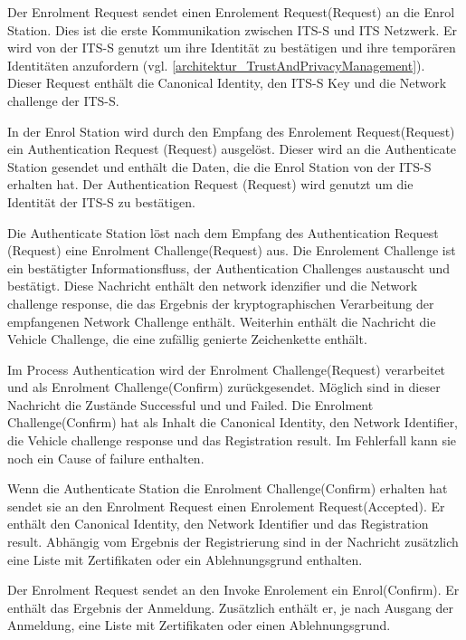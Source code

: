 Der Enrolment Request sendet einen Enrolement Request(Request) an die Enrol Station. Dies ist die erste Kommunikation zwischen \ac{ITS-S} und \ac{ITS} Netzwerk. Er wird von der \ac{ITS-S} genutzt um ihre Identität zu bestätigen und ihre temporären Identitäten anzufordern (vgl. \autoref{architektur_TrustAndPrivacyManagement}). Dieser Request enthält die Canonical Identity, den \ac{ITS-S} Key und die Network challenge der \ac{ITS-S}. 

In der Enrol Station wird durch den Empfang des Enrolement Request(Request) ein Authentication Request (Request) ausgelöst. Dieser wird an die Authenticate Station gesendet und enthält die Daten, die die Enrol Station von der \ac{ITS-S} erhalten hat. Der Authentication Request (Request) wird genutzt um die Identität der \ac{ITS-S} zu bestätigen.

Die Authenticate Station löst nach dem Empfang des Authentication Request (Request) eine Enrolment Challenge(Request) aus. Die Enrolement Challenge ist ein  bestätigter Informationsfluss, der Authentication Challenges austauscht und bestätigt.  Diese Nachricht enthält den network idenzifier  und die Network challenge response, die das Ergebnis der kryptographischen Verarbeitung der empfangenen Network Challenge enthält. Weiterhin enthält die Nachricht die Vehicle Challenge, die eine zufällig genierte  Zeichenkette enthält.

Im Process Authentication wird der Enrolment Challenge(Request) verarbeitet und als Enrolment Challenge(Confirm) zurückgesendet. Möglich sind in dieser Nachricht die Zustände Successful und und Failed. Die  Enrolment Challenge(Confirm) hat als Inhalt die Canonical Identity, den Network Identifier, die Vehicle challenge response und das Registration result. Im Fehlerfall kann sie noch  ein Cause of failure enthalten.

Wenn die Authenticate Station die Enrolment Challenge(Confirm) erhalten hat sendet sie an den Enrolment Request einen Enrolement Request(Accepted). Er enthält den Canonical Identity, den Network Identifier und das Registration result. Abhängig vom Ergebnis der Registrierung sind in der Nachricht zusätzlich eine Liste mit Zertifikaten oder ein Ablehnungsgrund enthalten.

Der Enrolment Request sendet an den Invoke Enrolement ein Enrol(Confirm). Er enthält das Ergebnis der Anmeldung. Zusätzlich enthält er, je nach Ausgang der Anmeldung, eine Liste mit Zertifikaten oder einen Ablehnungsgrund.